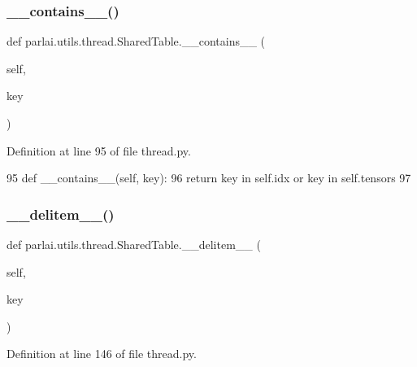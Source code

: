 \subsubsection{\texorpdfstring{\+\_\+\+\_\+contains\+\_\+\+\_\+()}{\_\_contains\_\_()}}
{\footnotesize\ttfamily def parlai.\+utils.\+thread.\+Shared\+Table.\+\_\+\+\_\+contains\+\_\+\+\_\+ (\begin{DoxyParamCaption}\item[{}]{self,  }\item[{}]{key }\end{DoxyParamCaption})}



Definition at line 95 of file thread.\+py.


\begin{DoxyCode}
95     \textcolor{keyword}{def }\_\_contains\_\_(self, key):
96         \textcolor{keywordflow}{return} key \textcolor{keywordflow}{in} self.idx \textcolor{keywordflow}{or} key \textcolor{keywordflow}{in} self.tensors
97 
\end{DoxyCode}
\mbox{\label{classparlai_1_1utils_1_1thread_1_1SharedTable_a567947ad20bdc1ad18815fc1883ea247}} 
\subsubsection{\texorpdfstring{\+\_\+\+\_\+delitem\+\_\+\+\_\+()}{\_\_delitem\_\_()}}
{\footnotesize\ttfamily def parlai.\+utils.\+thread.\+Shared\+Table.\+\_\+\+\_\+delitem\+\_\+\+\_\+ (\begin{DoxyParamCaption}\item[{}]{self,  }\item[{}]{key }\end{DoxyParamCaption})}



Definition at line 146 of file thread.\+py.


